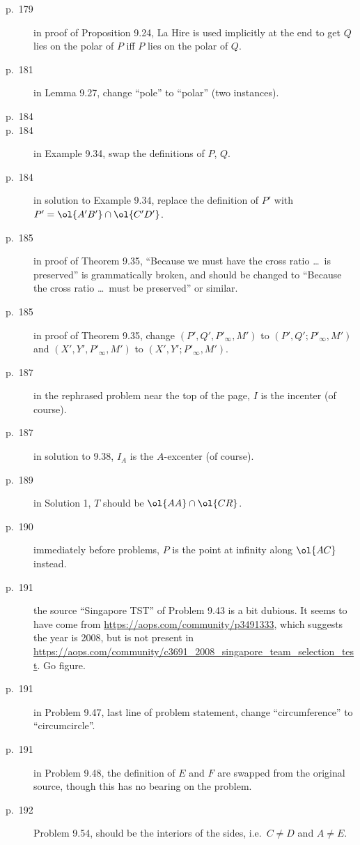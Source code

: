 \documentclass[11pt]{scrartcl}
\begin{document}
\begin{description}
\item[p.\  179] in proof of Proposition 9.24, La Hire is used implicitly at the end
  to get $Q$ lies on the polar of $P$ iff $P$ lies on the polar of $Q$.
\item[p.\  181] in Lemma 9.27, change ``pole'' to ``polar'' (two instances).
\item[p.\  184] 
\item[p.\  184] in Example 9.34, swap the definitions of $P$, $Q$.
\item[p.\  184] in solution to Example 9.34,
  replace the definition of $P'$ with $P' = \ol{A'B'} \cap \ol{C'D'}$.
\item[p.\  185] in proof of Theorem 9.35,
  ``Because we must have the cross ratio \dots\ is preserved''
  is grammatically broken, and should be changed to
  ``Because the cross ratio \dots\ must be preserved'' or similar.
\item[p.\  185] in proof of Theorem 9.35, change
  $(P', Q', P'_\infty, M')$ to $(P', Q'; P'_\infty, M')$
  and $(X', Y', P'_\infty, M')$ to $(X', Y'; P'_\infty, M')$.
\item[p.\  187] in the rephrased problem near the top of the page, $I$ is the incenter (of course).
\item[p.\  187] in solution to 9.38, $I_A$ is the $A$-excenter (of course).
\item[p.\  189] in Solution 1, $T$ should be $\ol{AA} \cap \ol{CR}$.
\item[p.\  190] immediately before problems, $P$ is the point at infinity along $\ol{AC}$ instead.
\item[p.\  191] the source ``Singapore TST'' of Problem 9.43 is a bit dubious.
  It seems to have come from \url{https://aops.com/community/p3491333},
  which suggests the year is 2008,
  but is not present in \url{https://aops.com/community/c3691_2008_singapore_team_selection_test}.
  Go figure.
\item[p.\  191] in Problem 9.47, last line of problem statement,
  change ``circumference'' to ``circumcircle''.
\item[p.\  191] in Problem 9.48, the definition of $E$ and $F$ are swapped from
  the original source, though this has no bearing on the problem.
\item[p.\  192] Problem 9.54, should be the interiors of the sides, i.e.\ $C \neq D$ and $A \neq E$.

\end{description}
\end{document}
